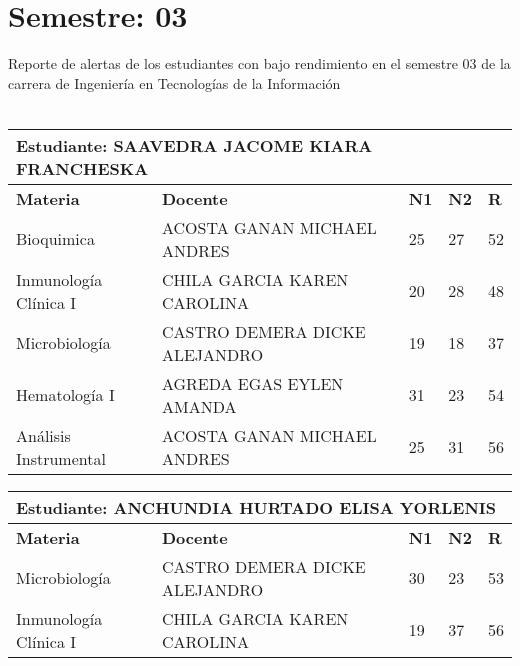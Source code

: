 \section{Semestre: 03}
        Reporte de alertas de los estudiantes con bajo rendimiento en el semestre 03 de la carrera de 
        Ingeniería en Tecnologías de la Información\\\\\small
\begin{tabularx}{\textwidth}{|p{5cm}|p{7cm}|X|X|X|}
\hline
\multicolumn{5}{|p{\dimexpr\textwidth-2\tabcolsep-2\arrayrulewidth}|}{\textbf{Estudiante: SAAVEDRA JACOME KIARA FRANCHESKA }}\\\hline
\textbf{Materia} & \textbf{Docente} & \textbf{N1} & \textbf{N2} & \textbf{R} \\ \hline
Bioquimica & ACOSTA GANAN MICHAEL ANDRES  & 25 & 27& 52 \\ \hline
Inmunología Clínica I & CHILA GARCIA KAREN CAROLINA  & 20 & 28& 48 \\ \hline
Microbiología & CASTRO DEMERA DICKE ALEJANDRO  & 19 & 18& 37 \\ \hline
Hematología I & AGREDA EGAS EYLEN AMANDA  & 31 & 23& 54 \\ \hline
Análisis Instrumental & ACOSTA GANAN MICHAEL ANDRES  & 25 & 31& 56 \\ \hline
\end{tabularx}\vspace{10mm}
\small
\begin{tabularx}{\textwidth}{|p{5cm}|p{7cm}|X|X|X|}
\hline
\multicolumn{5}{|p{\dimexpr\textwidth-2\tabcolsep-2\arrayrulewidth}|}{\textbf{Estudiante: ANCHUNDIA HURTADO ELISA YORLENIS }}\\\hline
\textbf{Materia} & \textbf{Docente} & \textbf{N1} & \textbf{N2} & \textbf{R} \\ \hline
Microbiología & CASTRO DEMERA DICKE ALEJANDRO  & 30 & 23& 53 \\ \hline
Inmunología Clínica I & CHILA GARCIA KAREN CAROLINA  & 19 & 37& 56 \\ \hline
\end{tabularx}\vspace{10mm}
\small
